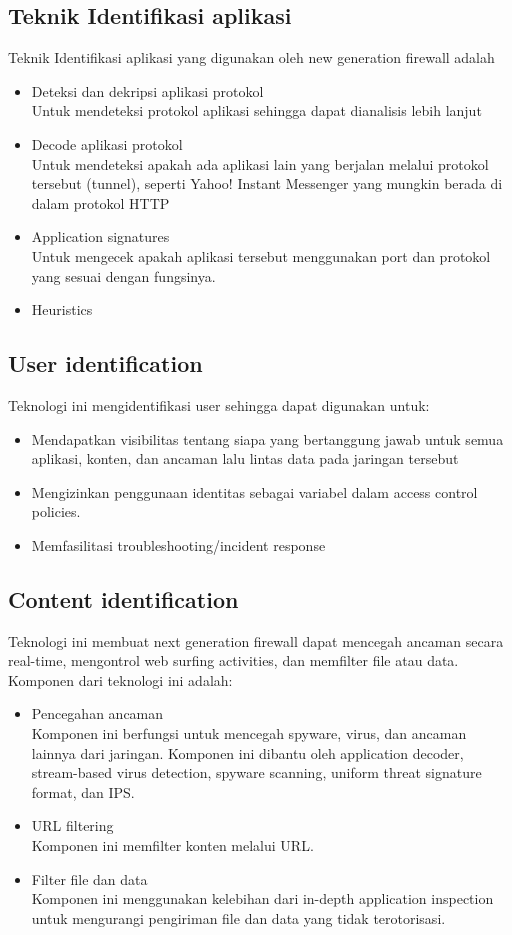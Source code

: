 \subsection{Teknik Identifikasi aplikasi}
Teknik Identifikasi aplikasi yang digunakan oleh new generation firewall adalah
\begin{itemize}
	\item Deteksi dan dekripsi aplikasi protokol\\
	Untuk mendeteksi protokol aplikasi sehingga dapat dianalisis lebih lanjut
	\item Decode aplikasi protokol\\
	Untuk mendeteksi apakah ada aplikasi lain yang berjalan melalui protokol tersebut (tunnel), seperti Yahoo! Instant Messenger yang mungkin berada di dalam protokol HTTP
	\item Application signatures\\
	Untuk mengecek apakah aplikasi tersebut menggunakan port dan protokol yang sesuai dengan fungsinya.
	\item Heuristics
\end{itemize}

\subsection{User identification}
Teknologi ini mengidentifikasi user sehingga dapat digunakan untuk:
\begin{itemize}
	\item Mendapatkan visibilitas tentang siapa yang bertanggung jawab untuk semua aplikasi, konten, dan ancaman lalu lintas data pada jaringan tersebut
	\item Mengizinkan penggunaan identitas sebagai variabel dalam access control policies.
	\item Memfasilitasi troubleshooting/incident response
\end{itemize}

\subsection{Content identification}
Teknologi ini membuat next generation firewall dapat mencegah ancaman secara real-time, mengontrol web surfing activities, dan memfilter file atau data. Komponen dari teknologi ini adalah:
\begin{itemize}
	\item Pencegahan ancaman\\
	Komponen ini berfungsi untuk mencegah spyware, virus, dan ancaman lainnya dari jaringan. Komponen ini dibantu oleh application decoder, stream-based virus detection, spyware scanning, uniform threat signature format, dan IPS.
	\item URL filtering\\
	Komponen ini memfilter konten melalui URL.
	\item Filter file dan data\\
	Komponen ini menggunakan kelebihan dari in-depth application inspection untuk mengurangi pengiriman file dan data yang tidak terotorisasi. 
\end{itemize}

